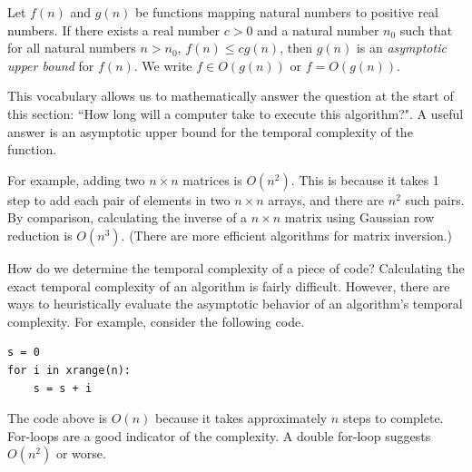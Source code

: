 \begin{definition}
Let $f(n)$ and $g(n)$ be functions mapping natural numbers to positive real numbers. If there exists a real number $c > 0$ and a natural number $n_0$ such that for all natural numbers $n > n_0$, $f(n) \leq cg(n)$, then $g(n)$ is an \emph{asymptotic upper bound} for $f(n)$. We write $f \in O(g(n))$ or $f = O(g(n))$.
\end{definition}

This vocabulary allows us to mathematically answer the question at the start of this section: ``How long will a computer take to execute this algorithm?". A useful answer is an asymptotic upper bound for the temporal complexity of the function.

For example, adding two $n \times n$ matrices is $O(n^2)$. This is because it takes 1 step to add each pair of elements in two $n \times n$ arrays, and there are $n^2$ such pairs.
By comparison, calculating the inverse of a $n \times n$ matrix using Gaussian
row reduction is $O(n^3)$. (There are more efficient
algorithms for matrix inversion.)

How do we determine the temporal complexity of a piece of code?
Calculating the exact temporal complexity of an algorithm is fairly difficult.
However, there are ways to heuristically evaluate the asymptotic behavior of an algorithm's temporal complexity. For example, consider the following code.

\begin{lstlisting}
s = 0
for i in xrange(n):
    s = s + i
\end{lstlisting}

The code above is $O(n)$ because it takes approximately $n$ steps to complete. For-loops are a good indicator of the complexity.  A double for-loop suggests $O(n^2)$ or worse.  

